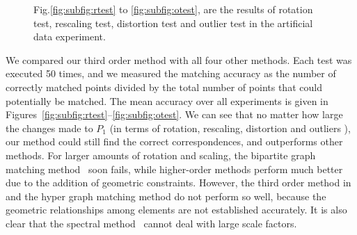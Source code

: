 \begin{figure}[!t]
\begin{minipage}[b]{0.4\textwidth}
        \end{minipage}%
        \hspace{14mm}%
        \begin{minipage}[b]{0.4\textwidth}
        \end{minipage}%
        \caption{Fig.\ref{fig:subfig:rtest} to \ref{fig:subfig:otest}, are the results of rotation test, rescaling test, distortion test and outlier test in the artificial data experiment. }
\label{fig:mini:subfig_part1} %
\end{figure}

We compared our third order method with all four other methods. Each test was executed 50 times, and we measured the matching accuracy as the number of correctly matched points divided by the total number of points that could potentially be matched. The mean accuracy over all experiments is given in Figures~\ref{fig:subfig:rtest}--\ref{fig:subfig:otest}. We can see that no matter how large the changes made to $P_1$ (in terms of rotation, rescaling, distortion and outliers ), our method could still find the correct correspondences, and outperforms other methods.
For larger amounts of rotation and scaling, the bipartite graph matching method~\cite{Belongie02} soon fails, while higher-order methods perform much better due to the addition of geometric constraints. However, the third order method in~\cite{Duchenne_etal09} and the hyper graph matching method do not perform so well, because the geometric relationships among elements are not established accurately. It is also clear that the spectral method~\cite{Cour06} cannot deal with large scale factors.

